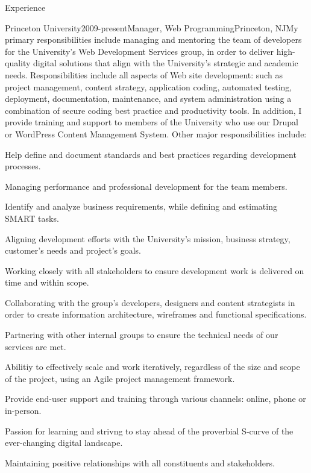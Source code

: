 \documentclass[12pt]{resume}
\begin{document}
\begin{rSection}{Experience}
\begin{rSubsection}{Princeton University}{2009-present}{Manager, Web Programming}{Princeton, NJ}{My primary responsibilities include managing and mentoring the team of developers for the University's Web Development Services group, in order to deliver high-quality digital solutions that align with the University's strategic and academic needs. Responsibilities include all aspects of Web site development: such as project management, content strategy, application coding, automated testing, deployment, documentation, maintenance, and system administration using a combination of secure coding best practice and productivity tools. In addition, I provide training and support to members of the University who use our Drupal or WordPress Content Management System. Other major responsibilities include:}
\item Help define and document standards and best practices regarding development processes.
\item Managing performance and professional development for the team members.
\item Identify and analyze business requirements, while defining and estimating SMART tasks.
\item Aligning development efforts with the University's mission, business strategy, customer's needs and project's goals.
\item Working closely with all stakeholders to ensure development work is delivered on time and within scope.
\item Collaborating with the group’s developers, designers and content strategists in order to create information architecture, wireframes and functional specifications.
\item Partnering with other internal groups to ensure the technical needs of our services are met.
\item Abilitiy to effectively scale and work iteratively, regardless of the size and scope of the project, using an Agile project management framework.
\item Provide end-user support and training through various channels: online, phone or in-person.
\item Passion for learning and strivng to stay ahead of the proverbial S-curve of the ever-changing digital landscape.
\item Maintaining positive relationships with all constituents and stakeholders.
\end{rSubsection}


\end{rSection}
\end{document}
